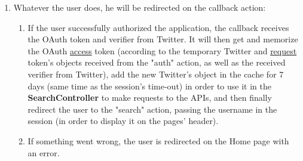 \documentclass[a4paper,11pt]{report}
\begin{document}
\begin{enumerate}
	\item Whatever the user does, he will be redirected on the callback action: 
	\begin{enumerate}
		\item If the user successfully authorized the application, the callback receives the OAuth token and verifier from Twitter. It will then get and memorize the OAuth \underline{access} token (according to the temporary Twitter and \underline{request} token's objects received from the "auth" action, as well as the received verifier from Twitter), add the new Twitter's object in the cache for 7 days (same time as the session's time-out) in order to use it in the \textbf{SearchController} to make requests to the APIs, and then finally redirect the user to the "search" action, passing the username in the session (in order to display it on the pages' header).
		\item If something went wrong, the user is redirected on the Home page with an error.
	\end{enumerate}
\end{enumerate}
\newpage
\end{document}
